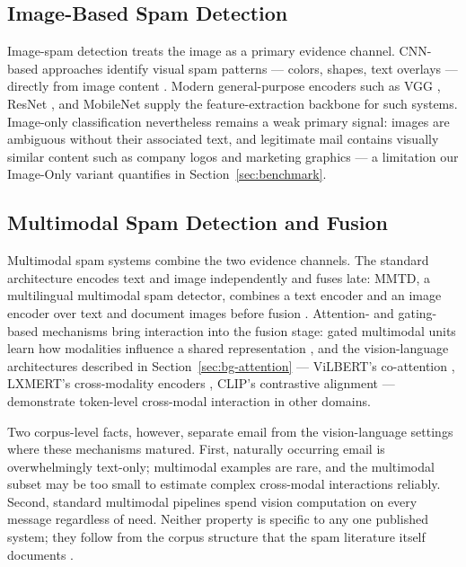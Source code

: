 \documentclass[10pt,twoside]{article}
\begin{document}
\subsection{Image-Based Spam Detection}\label{sec:rw-image}

Image-spam detection treats the image as a primary evidence channel. CNN-based approaches identify visual spam patterns --- colors, shapes, text overlays --- directly from image content \citep{annadatha2018image}. Modern general-purpose encoders such as VGG \citep{simonyan2015vgg}, ResNet \citep{he2016resnet}, and MobileNet \citep{howard2017mobilenets} supply the feature-extraction backbone for such systems. Image-only classification nevertheless remains a weak primary signal: images are ambiguous without their associated text, and legitimate mail contains visually similar content such as company logos and marketing graphics --- a limitation our Image-Only variant quantifies in Section~\ref{sec:benchmark}.

\subsection{Multimodal Spam Detection and Fusion}\label{sec:rw-multimodal}

Multimodal spam systems combine the two evidence channels. The standard architecture encodes text and image independently and fuses late: MMTD, a multilingual multimodal spam detector, combines a text encoder and an image encoder over text and document images before fusion \citep{zhang2023mmtd}. Attention- and gating-based mechanisms bring interaction into the fusion stage: gated multimodal units learn how modalities influence a shared representation \citep{arevalo2017gmu}, and the vision-language architectures described in Section~\ref{sec:bg-attention} --- ViLBERT's co-attention \citep{lu2019vilbert}, LXMERT's cross-modality encoders \citep{tan2019lxmert}, CLIP's contrastive alignment \citep{radford2021clip} --- demonstrate token-level cross-modal interaction in other domains.

Two corpus-level facts, however, separate email from the vision-language settings where these mechanisms matured. First, naturally occurring email is overwhelmingly text-only; multimodal examples are rare, and the multimodal subset may be too small to estimate complex cross-modal interactions reliably. Second, standard multimodal pipelines spend vision computation on every message regardless of need. Neither property is specific to any one published system; they follow from the corpus structure that the spam literature itself documents \citep{janez2023review,annadatha2018image,zhang2023mmtd}.
\end{document}
